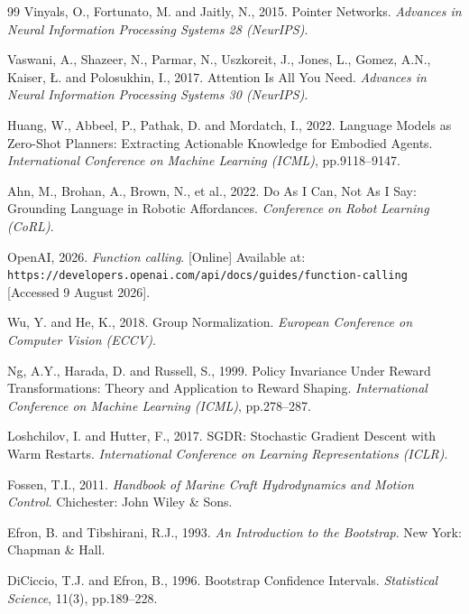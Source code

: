 \begin{thebibliography}{99}
Vinyals, O., Fortunato, M. and Jaitly, N., 2015.
Pointer Networks.
\textit{Advances in Neural Information Processing Systems 28 (NeurIPS)}.

Vaswani, A., Shazeer, N., Parmar, N., Uszkoreit, J., Jones, L., Gomez, A.N.,
Kaiser, {\L}. and Polosukhin, I., 2017.
Attention Is All You Need.
\textit{Advances in Neural Information Processing Systems 30 (NeurIPS)}.

Huang, W., Abbeel, P., Pathak, D. and Mordatch, I., 2022.
Language Models as Zero-Shot Planners: Extracting Actionable Knowledge for
Embodied Agents.
\textit{International Conference on Machine Learning (ICML)}, pp.9118--9147.

Ahn, M., Brohan, A., Brown, N., et al., 2022.
Do As I Can, Not As I Say: Grounding Language in Robotic Affordances.
\textit{Conference on Robot Learning (CoRL)}.

OpenAI, 2026. \textit{Function calling}. [Online]
Available at: \texttt{https://developers.openai.com/api/docs/guides/function-calling}
[Accessed 9 August 2026].

Wu, Y. and He, K., 2018.
Group Normalization.
\textit{European Conference on Computer Vision (ECCV)}.

Ng, A.Y., Harada, D. and Russell, S., 1999.
Policy Invariance Under Reward Transformations: Theory and Application to
Reward Shaping.
\textit{International Conference on Machine Learning (ICML)}, pp.278--287.

Loshchilov, I. and Hutter, F., 2017.
SGDR: Stochastic Gradient Descent with Warm Restarts.
\textit{International Conference on Learning Representations (ICLR)}.

Fossen, T.I., 2011.
\textit{Handbook of Marine Craft Hydrodynamics and Motion Control}.
Chichester: John Wiley \& Sons.

Efron, B. and Tibshirani, R.J., 1993.
\textit{An Introduction to the Bootstrap}. New York: Chapman \& Hall.

DiCiccio, T.J. and Efron, B., 1996.
Bootstrap Confidence Intervals.
\textit{Statistical Science}, 11(3), pp.189--228.

\end{thebibliography}
